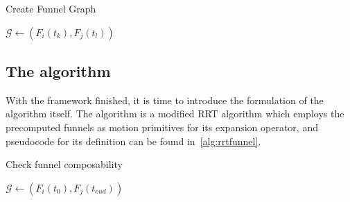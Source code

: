 \begin{algorithm}
  \caption{Create Funnel Graph}
  \label{alg:create-funnel-graph}
  \DontPrintSemicolon \SetAlgoNoLine

   

   {  {
       {  {
           { \(\mathcal{G}
            \leftarrow{} \left( F_{i}(t_{k}), F_{j}(t_{l}) \right)\) }
        }
      }
    }
  }

\end{algorithm}

\subsection{The \rrtfunnel{} algorithm}

With the framework finished, it is time to introduce the formulation of the
\rrtfunnel{} algorithm itself. The \rrtfunnel{} algorithm is a modified \ac{RRT}
algorithm which employs the precomputed funnels as motion primitives for its
expansion operator, and pseudocode for its definition can be found
in~\ref{alg:rrtfunnel}.

\begin{algorithm}
  \caption{Check funnel composability}
  \label{alg:create-funnel-graph}
  \DontPrintSemicolon \SetAlgoNoLine

   

   {  {
       { \(\mathcal{G} \leftarrow{}
        \left( F_{i}(t_{0}), F_{j}(t_{end}) \right)\) } \; }\; }\;

\end{algorithm}

